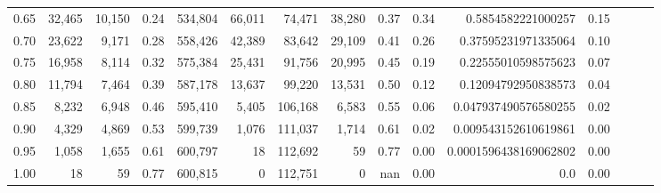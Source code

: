 \begin{tabular}{rrrrrrrrrrrrrrr}
0.65 &  32,465 &  10,150 &  0.24 &  534,804 &   66,011 &   74,471 &   38,280 &  0.37 &  0.34 &     0.5854582221000257 &      0.15 \\
0.70 &  23,622 &   9,171 &  0.28 &  558,426 &   42,389 &   83,642 &   29,109 &  0.41 &  0.26 &    0.37595231971335064 &      0.10 \\
0.75 &  16,958 &   8,114 &  0.32 &  575,384 &   25,431 &   91,756 &   20,995 &  0.45 &  0.19 &    0.22555010598575623 &      0.07 \\
0.80 &  11,794 &   7,464 &  0.39 &  587,178 &   13,637 &   99,220 &   13,531 &  0.50 &  0.12 &    0.12094792950838573 &      0.04 \\
0.85 &   8,232 &   6,948 &  0.46 &  595,410 &    5,405 &  106,168 &    6,583 &  0.55 &  0.06 &   0.047937490576580255 &      0.02 \\
0.90 &   4,329 &   4,869 &  0.53 &  599,739 &    1,076 &  111,037 &    1,714 &  0.61 &  0.02 &   0.009543152610619861 &      0.00 \\
0.95 &   1,058 &   1,655 &  0.61 &  600,797 &       18 &  112,692 &       59 &  0.77 &  0.00 &  0.0001596438169062802 &      0.00 \\
1.00 &      18 &      59 &  0.77 &  600,815 &        0 &  112,751 &        0 &   nan &  0.00 &                    0.0 &      0.00 \\
\bottomrule
\end{tabular}
